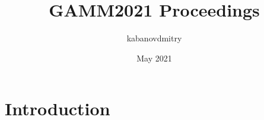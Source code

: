 \documentclass{article}
\title{GAMM2021 Proceedings}
\author{kabanovdmitry }
\date{May 2021}
\begin{document}
\maketitle

\section{Introduction}
\end{document}
